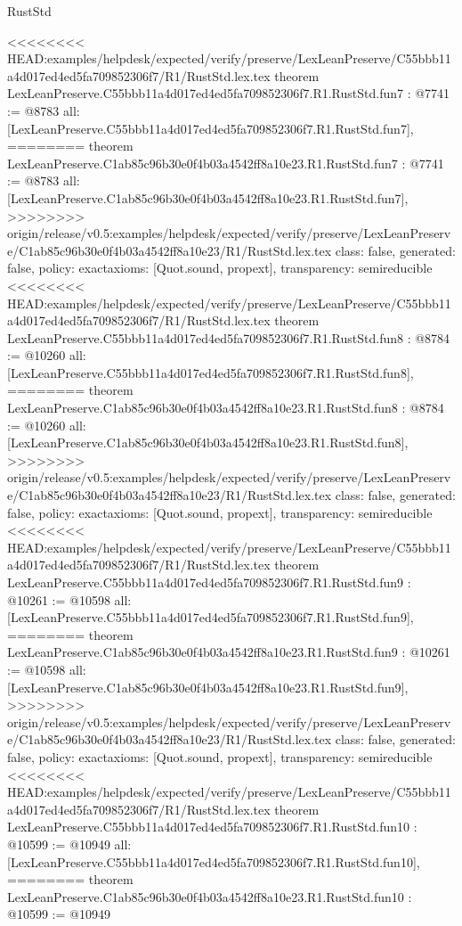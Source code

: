 \begin{lexlean}{RustStd}
\begin{coremodule}
{\begin{coremodule}
{{{{{{{{{{}
<<<<<<<< HEAD:examples/helpdesk/expected/verify/preserve/LexLeanPreserve/C55bbb11a4d017ed4ed5fa709852306f7/R1/RustStd.lex.tex
theorem LexLeanPreserve.C55bbb11a4d017ed4ed5fa709852306f7.R1.RustStd.fun7 : @7741 := @8783 {
  all: [LexLeanPreserve.C55bbb11a4d017ed4ed5fa709852306f7.R1.RustStd.fun7],
========
theorem LexLeanPreserve.C1ab85c96b30e0f4b03a4542ff8a10e23.R1.RustStd.fun7 : @7741 := @8783 {
  all: [LexLeanPreserve.C1ab85c96b30e0f4b03a4542ff8a10e23.R1.RustStd.fun7],
>>>>>>>> origin/release/v0.5:examples/helpdesk/expected/verify/preserve/LexLeanPreserve/C1ab85c96b30e0f4b03a4542ff8a10e23/R1/RustStd.lex.tex
  class: false,
  generated: false,
  policy: exact{axioms: [Quot.sound, propext]},
  transparency: semireducible
}
<<<<<<<< HEAD:examples/helpdesk/expected/verify/preserve/LexLeanPreserve/C55bbb11a4d017ed4ed5fa709852306f7/R1/RustStd.lex.tex
theorem LexLeanPreserve.C55bbb11a4d017ed4ed5fa709852306f7.R1.RustStd.fun8 : @8784 := @10260 {
  all: [LexLeanPreserve.C55bbb11a4d017ed4ed5fa709852306f7.R1.RustStd.fun8],
========
theorem LexLeanPreserve.C1ab85c96b30e0f4b03a4542ff8a10e23.R1.RustStd.fun8 : @8784 := @10260 {
  all: [LexLeanPreserve.C1ab85c96b30e0f4b03a4542ff8a10e23.R1.RustStd.fun8],
>>>>>>>> origin/release/v0.5:examples/helpdesk/expected/verify/preserve/LexLeanPreserve/C1ab85c96b30e0f4b03a4542ff8a10e23/R1/RustStd.lex.tex
  class: false,
  generated: false,
  policy: exact{axioms: [Quot.sound, propext]},
  transparency: semireducible
}
<<<<<<<< HEAD:examples/helpdesk/expected/verify/preserve/LexLeanPreserve/C55bbb11a4d017ed4ed5fa709852306f7/R1/RustStd.lex.tex
theorem LexLeanPreserve.C55bbb11a4d017ed4ed5fa709852306f7.R1.RustStd.fun9 : @10261 := @10598 {
  all: [LexLeanPreserve.C55bbb11a4d017ed4ed5fa709852306f7.R1.RustStd.fun9],
========
theorem LexLeanPreserve.C1ab85c96b30e0f4b03a4542ff8a10e23.R1.RustStd.fun9 : @10261 := @10598 {
  all: [LexLeanPreserve.C1ab85c96b30e0f4b03a4542ff8a10e23.R1.RustStd.fun9],
>>>>>>>> origin/release/v0.5:examples/helpdesk/expected/verify/preserve/LexLeanPreserve/C1ab85c96b30e0f4b03a4542ff8a10e23/R1/RustStd.lex.tex
  class: false,
  generated: false,
  policy: exact{axioms: [Quot.sound, propext]},
  transparency: semireducible
}
<<<<<<<< HEAD:examples/helpdesk/expected/verify/preserve/LexLeanPreserve/C55bbb11a4d017ed4ed5fa709852306f7/R1/RustStd.lex.tex
theorem LexLeanPreserve.C55bbb11a4d017ed4ed5fa709852306f7.R1.RustStd.fun10 : @10599 := @10949 {
  all: [LexLeanPreserve.C55bbb11a4d017ed4ed5fa709852306f7.R1.RustStd.fun10],
========
theorem LexLeanPreserve.C1ab85c96b30e0f4b03a4542ff8a10e23.R1.RustStd.fun10 : @10599 := @10949 {
}}}}}}}}}}}}}}
\end{coremodule}}
\end{coremodule}
\end{lexlean}

